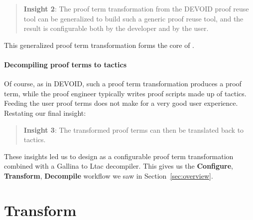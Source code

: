 \begin{quote}
\textbf{Insight 2}:
The proof term transformation from the \textsc{DEVOID} proof reuse tool can be generalized
to build such a generic proof reuse tool, and the result is configurable both by the developer and by the user.
\end{quote}
This generalized proof term transformation forms the core of \toolname.

\paragraph{Decompiling proof terms to tactics}

Of course, as in \textsc{DEVOID}, such a proof term transformation produces a proof term,
while the proof engineer typically writes proof scripts made up of tactics.
Feeding the user proof terms does not make for a very good user experience.
Restating our final insight:

\begin{quote}
\textbf{Insight 3}: The transformed proof terms can then be translated back to tactics.
\end{quote} 

These insights led us to design \toolname as a configurable proof term transformation
combined with a Gallina to Ltac decompiler.
This gives us the \textbf{Configure}, \textbf{Transform}, \textbf{Decompile} workflow we saw in Section~\ref{sec:overview}.

\section{Transform}
\label{sec:meat}


